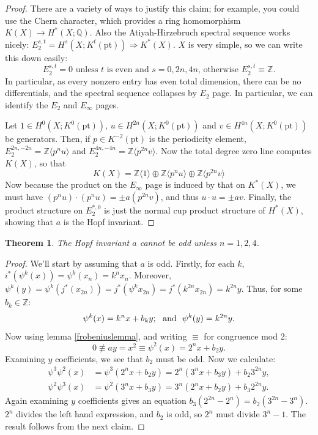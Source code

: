 \documentclass{article}
\newcommand{\Z}{\mathbb{Z}}
\newcommand{\Q}{\mathbb{Q}}
\newcommand{\ptspace}{\mathrm{pt}}
\newtheorem{thm}{Theorem}[section]
\begin{document}
\begin{proof}
There are a variety of ways to justify this claim; for example, you could use the Chern character, which provides a ring homomorphism $K(X) \to H^*(X; \Q)$.  Also the Atiyah-Hirzebruch spectral sequence works nicely: $E_2^{s, t} = H^s(X; K^t(\ptspace)) \Rightarrow K^*(X)$.  $X$ is very simple, so we can write this down easily:
\[E_2^{s,t}=0\text{ unless $t$ is even and $s=0,2n,4n$, otherwise $E_2^{s,t}\equiv\Z$.}\]
In particular, as every nonzero entry has even total dimension, there can be no differentials, and the spectral sequence collapses by $E_2$ page. In particular, we can identify the $E_2$ and $E_\infty$ pages.

Let $1\in H^{0}(X;K^0(\ptspace))$, $u\in H^{2n}(X;K^0(\ptspace))$ and $v\in H^{4n}(X;K^0(\ptspace))$ be generators. Then, if $p\in K^{-2}(\ptspace)$ is the periodicity element, $E_2^{2n,-2n}=\Z\langle p^nu\rangle$ and $E_2^{4n,-4n}=\Z\langle p^{2n}v\rangle$.
Now the total degree zero line computes $K(X)$, so that 
\[K(X)= 
\Z\langle1\rangle\oplus
\Z\langle p^nu\rangle\oplus
\Z\langle p^{2n}v\rangle\]
Now because the product on the $E_\infty$ page is induced by that on $K^*(X)$, we must have $(p^nu)\cdot(p^nu)=\pm a(p^{2n}v)$, and thus $u\cdot u=\pm av$. Finally, the product structure on $E_2^{*,0}$ is just the normal cup product structure of $H^*(X)$, showing that $a$ is the Hopf invariant.
%
\end{proof}
\begin{thm}
The Hopf invariant $a$ cannot be odd unless $n = 1, 2, 4$.
\end{thm}
\begin{proof}
We'll start by assuming that $a$ is odd.
Firstly, for each $k$, $i^*(\psi^k(x))=\psi^k(x_n)=k^nx_n$. Moreover, $\psi^k(y)=\psi^k(j^*(x_{2n}))=j^*(\psi^kx_{2n})
=j^*(k^{2n}x_{2n})=k^{2n}y$. Thus, for some $b_k\in\Z$:
\[\psi^k(x)=k^nx+b_ky;\textup{ \ and \ }\psi^k(y)=k^{2n}y.\]
Now using lemma \ref{frobeniuslemma}, and writing $\equiv$ for congruence mod 2:
\[0\not\equiv ay=x^2\equiv\psi^2(x)=2^nx+b_2y.\]
Examining $y$ coefficients, we see that $b_2$ must be odd. Now we calculate:
\begin{align*}
\psi^3 \psi^2(x) & = \psi^3(2^n x + b_2 y) = 2^n(3^n x + b_3 y) + b_2 3^{2n} y, \\
\psi^2 \psi^3(x) & = \psi^2(3^n x + b_3 y) = 3^n(2^n x + b_2 y) + b_3 2^{2n} y.
\end{align*}
Again examining $y$ coefficients gives an equation $b_3(2^{2n} - 2^n) = b_2(3^{2n} - 3^n)$.  $2^n$ divides the left hand expression, and $b_2$ is odd, so $2^n$ must divide $3^n - 1$. The result follows from the next claim.
\end{proof}
\end{document}
